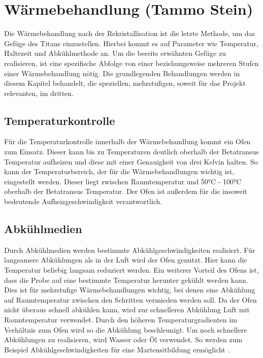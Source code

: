 \documentclass[a4paper, 11pt]{tubsreprt}
\begin{document}
\section{Wärmebehandlung (Tammo Stein)}

Die Wärmebehandlung nach der Rekristallisation ist die letzte Methode, um das Gefüge des Titans einzustellen. Hierbei kommt es auf Parameter wie Temperatur, Haltezeit und Abkühlmethode an. Um die bereits erwähnten Gefüge zu realisieren, ist eine spezifische Abfolge von einer beziehungsweise mehreren Stufen einer Wärmebehandlung nötig. Die grundlegenden Behandlungen werden in diesem Kapitel behandelt, die speziellen, mehrstufigen, soweit für das Projekt relevanten, im dritten.
\subsection{Temperaturkontrolle}
Für die Temperaturkontrolle innerhalb der Wärmebehandlung kommt ein Ofen zum Einsatz. Dieser kann bis zu Temperaturen deutlich oberhalb der Betatransus Temperatur aufheizen und diese mit einer Genauigkeit von drei Kelvin halten. So kann der Temperaturbereich, der für die Wärmebehandlungen wichtig ist, eingestellt werden. Dieser liegt zwischen Raumtemperatur und 50°C - 100°C oberhalb der Betatransus Temperatur. Der Ofen ist außerdem für die insoweit bedeutende Aufheizgeschwindigkeit verantwortlich.

\subsection{Abkühlmedien}

Durch Abkühlmedien werden bestimmte Abkühlgeschwindigkeiten realisiert. Für langsamere Abkühlungen als in der Luft wird der Ofen genutzt. Hier kann die Temperatur beliebig langsam reduziert werden. Ein weiterer Vorteil des Ofens ist, dass die Probe auf eine bestimmte Temperatur herunter gekühlt werden kann. Dies ist für mehrstufige Wärmebehandlungen wichtig, bei denen eine Abkühlung auf Raumtemperatur zwischen den Schritten vermieden werden soll. 
Da der Ofen nicht überaus schnell abkühlen kann, wird zur schnelleren Abkühlung Luft mit Raumtemperatur verwendet. Durch den höheren Temperaturgradienten im Verhältnis zum Ofen wird so die Abkühlung beschleunigt.  
Um noch schnellere Abkühlungen zu realisieren, wird Wasser oder Öl verwendet. So werden zum Beispiel Abkühlgeschwindigkeiten für eine Martensitbildung ermöglicht \cite{Luetjering2007}.
\newpage
\end{document}
